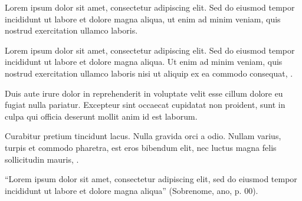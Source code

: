 \newpage
\vspace*{\fill}
\begin{flushright}
    \parbox{8cm}{
        \raggedright
        Lorem ipsum dolor sit amet, consectetur adipiscing elit. Sed do eiusmod tempor incididunt ut labore et dolore magna aliqua, ut enim ad minim veniam, quis nostrud exercitation ullamco laboris.
    }
\end{flushright}

\newpage
{}

Lorem ipsum dolor sit amet, consectetur adipiscing elit. Sed do eiusmod tempor incididunt ut labore et dolore magna aliqua. Ut enim ad minim veniam, quis nostrud exercitation ullamco laboris nisi ut aliquip ex ea commodo consequat, \advisorName.

Duis aute irure dolor in reprehenderit in voluptate velit esse cillum dolore eu fugiat nulla pariatur. Excepteur sint occaecat cupidatat non proident, sunt in culpa qui officia deserunt mollit anim id est laborum.

Curabitur pretium tincidunt lacus. Nulla gravida orci a odio. Nullam varius, turpis et commodo pharetra, est eros bibendum elit, nec luctus magna felis sollicitudin mauris, \universityName.

\newpage
\vspace*{\fill}
\begin{flushright}
    \parbox{8cm}{
        ``Lorem ipsum dolor sit amet, consectetur adipiscing elit, sed do eiusmod tempor incididunt ut labore et dolore magna aliqua'' (Sobrenome, ano, p. 00).
    }
\end{flushright}
